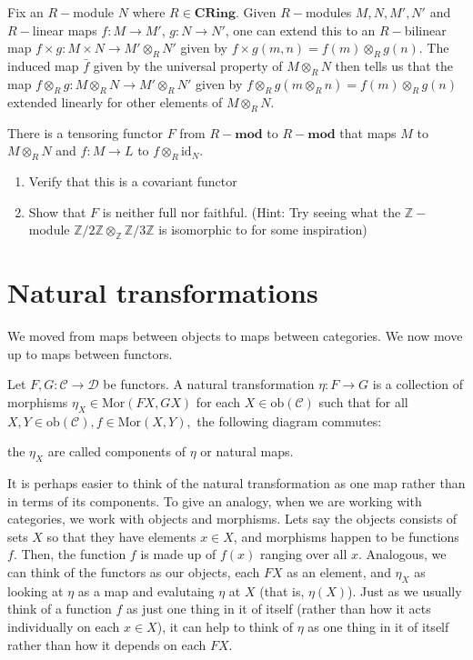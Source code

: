 \documentclass[12pt,reqno]{amsart}
\numberwithin{theorem}{section}
\theoremstyle{definition}
\theoremstyle{remark}
\numberwithin{equation}{section}
\newcommand{\cC}{\mathcal{C}}
\newcommand{\cD}{\mathcal{D}}
\newcommand{\Z}{\mathbb Z}
\theoremstyle{definition}
\newcommand{\ob}{\mathrm{ob}}
\newcommand{\id}{\mathrm{id}}
\newcommand{\Mor}{\mathrm{Mor}}
\begin{document}
\begin{exercise}
    Fix an $R-$module $N$ where $R \in \mathbf{CRing}$. Given $R-$modules $M,N,M',N'$ and $R-$linear maps $f:M\rightarrow M'$, $g:N\rightarrow N'$, one can extend this to an $R-$bilinear map $f\times g: M\times N \rightarrow M'\otimes_R N'$ given by $f\times g(m,n)=f(m)\otimes_R g(n)$. The induced map $\bar f$ given by the universal property of $M\otimes_RN$ then tells us that the map $f\otimes_R g: M\otimes_R N \rightarrow M'\otimes_R N'$ given by $f\otimes_R g(m\otimes_Rn)=f(m)\otimes_R g(n)$ extended linearly for other elements of $M\otimes_RN$.
    \par 
    There is a tensoring functor $F$ from $R-\mathbf{mod}$ to $R-\mathbf{mod}$ that maps $M$ to $M\otimes_R N$ and $f:M\rightarrow L$ to $f\otimes_R \id_N$. 
    \begin{enumerate}
        \item Verify that this is a covariant functor
        \item Show that $F$ is neither full nor faithful. (Hint: Try seeing what the $\Z-$module $\Z/2\Z\otimes _\Z \Z/3\Z$ is isomorphic to for some inspiration)
    \end{enumerate}
\end{exercise}
\section{Natural transformations}
We moved from maps between objects to maps between categories. We now move up to maps between functors.
\begin{definition}
    Let $F,G:\cC\rightarrow \cD$ be functors. A natural transformation $\eta:F\rightarrow G$ is a collection of morphisms $\eta_X \in \Mor(FX,GX)$ for each $X \in \ob(\cC)$ such that for all $X,Y \in \ob(\cC),f \in \Mor(X,Y),$ the following diagram commutes:
    \begin{center}
    \end{center}
    the $\eta_X$ are called components of $\eta$ or natural maps.
\end{definition}

It is perhaps easier to think of the natural transformation as one map rather than in terms of its components. To give an analogy, when we are working with categories, we work with objects and morphisms. Lets say the objects consists of sets $X$ so that they have elements $x\in X$, and morphisms happen to be functions $f$. Then, the function $f$ is made up of $f(x)$ ranging over all $x$. Analogous, we can think of the functors as our objects, each $FX$ as an element, and $\eta_X$ as looking at $\eta$ as a map and evalutaing $\eta$ at $X$ (that is, $\eta(X)$). Just as we usually think of a function $f$ as just one thing in it of itself (rather than how it acts individually on each $x \in X$), it can help to think of $\eta$ as one thing in it of itself rather than how it depends on each $FX$.
\end{document}
